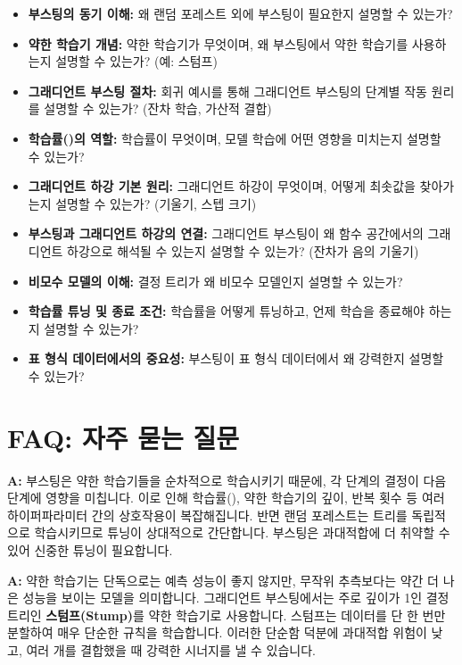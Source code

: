 \documentclass[11pt,a4paper]{book}
\theoremstyle{definition}
\begin{document}
\begin{itemize}
    \item \textbf{부스팅의 동기 이해:} 왜 랜덤 포레스트 외에 부스팅이 필요한지 설명할 수 있는가?
    \item \textbf{약한 학습기 개념:} 약한 학습기가 무엇이며, 왜 부스팅에서 약한 학습기를 사용하는지 설명할 수 있는가? (예: 스텀프)
    \item \textbf{그래디언트 부스팅 절차:} 회귀 예시를 통해 그래디언트 부스팅의 단계별 작동 원리를 설명할 수 있는가? (잔차 학습, 가산적 결합)
    \item \textbf{학습률(\texttt{\lambda})의 역할:} 학습률이 무엇이며, 모델 학습에 어떤 영향을 미치는지 설명할 수 있는가?
    \item \textbf{그래디언트 하강 기본 원리:} 그래디언트 하강이 무엇이며, 어떻게 최솟값을 찾아가는지 설명할 수 있는가? (기울기, 스텝 크기)
    \item \textbf{부스팅과 그래디언트 하강의 연결:} 그래디언트 부스팅이 왜 함수 공간에서의 그래디언트 하강으로 해석될 수 있는지 설명할 수 있는가? (잔차가 음의 기울기)
    \item \textbf{비모수 모델의 이해:} 결정 트리가 왜 비모수 모델인지 설명할 수 있는가?
    \item \textbf{학습률 튜닝 및 종료 조건:} 학습률을 어떻게 튜닝하고, 언제 학습을 종료해야 하는지 설명할 수 있는가?
    \item \textbf{표 형식 데이터에서의 중요성:} 부스팅이 표 형식 데이터에서 왜 강력한지 설명할 수 있는가?
\end{itemize}


\section{FAQ: 자주 묻는 질문}

\begin{faqbox}[title=\textbf{Q: 왜 부스팅이 랜덤 포레스트보다 튜닝하기 어려운가요?}] %
\textbf{A:} 부스팅은 약한 학습기들을 순차적으로 학습시키기 때문에, 각 단계의 결정이 다음 단계에 영향을 미칩니다. 이로 인해 학습률(\texttt{\lambda}), 약한 학습기의 깊이, 반복 횟수 등 여러 하이퍼파라미터 간의 상호작용이 복잡해집니다. 반면 랜덤 포레스트는 트리를 독립적으로 학습시키므로 튜닝이 상대적으로 간단합니다. 부스팅은 과대적합에 더 취약할 수 있어 신중한 튜닝이 필요합니다.
\end{faqbox}

\begin{faqbox}[title=\textbf{Q: 약한 학습기(Weak Learner)란 정확히 무엇인가요?}] %
\textbf{A:} 약한 학습기는 단독으로는 예측 성능이 좋지 않지만, 무작위 추측보다는 약간 더 나은 성능을 보이는 모델을 의미합니다. 그래디언트 부스팅에서는 주로 깊이가 1인 결정 트리인 \textbf{스텀프(Stump)}를 약한 학습기로 사용합니다. 스텀프는 데이터를 단 한 번만 분할하여 매우 단순한 규칙을 학습합니다. 이러한 단순함 덕분에 과대적합 위험이 낮고, 여러 개를 결합했을 때 강력한 시너지를 낼 수 있습니다.
\end{faqbox}
\end{document}

